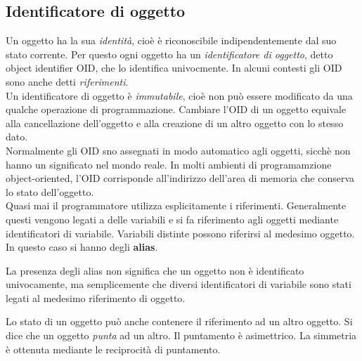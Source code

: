 \documentclass[12pt]{report}
\begin{document}
\subsection{Identificatore di oggetto}
Un oggetto ha la sua \textit{identità}, cioè è riconoscibile indipendentemente dal suo stato corrente. Per questo ogni oggetto ha un \textit{identificatore di oggetto}, detto object identifier OID, che lo identifica univocmente. In alcuni contesti gli OID sono anche detti \textit{riferimenti}. \\
Un identificatore di oggetto è \textit{immutabile}, cioè non può essere modificato da una qualche operazione di programmazione. Cambiare l'OID di un oggetto equivale alla cancellazione dell'oggetto e alla creazione di un altro oggetto con lo stesso dato. \\
Normalmente gli OID sno assegnati in modo automatico agli oggetti, sicchè non hanno un significato nel mondo reale. In molti ambienti di programamzione object-oriented, l'OID corrisponde all'indirizzo dell'area di memoria che conserva lo stato dell'oggetto.\\
Quasi mai il programmatore utilizza esplicitamente i riferimenti. Generalmente questi vengono legati a delle variabili e si fa riferimento agli oggetti mediante identificatori di variabile. Variabili distinte possono riferirsi al medesimo oggetto. In questo caso si hanno degli \textbf{alias}.
\begin{note}{}{}
	La presenza degli alias non significa che un oggetto non è identificato univocamente, ma semplicemente che diversi identificatori di variabile sono stati legati al medesimo riferimento di oggetto.
\end{note}
Lo stato di un oggetto può anche contenere il riferimento ad un altro oggetto. Si dice che un oggetto \textit{punta} ad un altro. Il puntamento è asimettrico. La simmetria è ottenuta mediante le reciprocità di puntamento.
\end{document}
